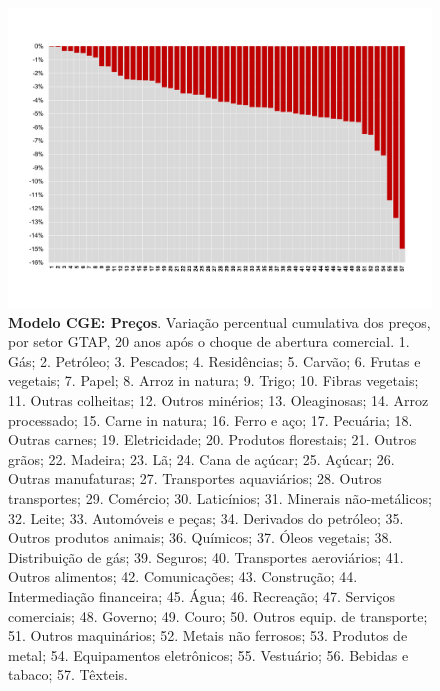 \documentclass{article}
\begin{document}
\newpage
\begin{landscape}
\begin{figure}[htbp]
    \centering
    \includegraphics[scale=0.8]{mod_estatico_precos.pdf}
    \caption[Modelo CGE: Preços]{\textbf{Modelo CGE: Preços}. Variação percentual cumulativa dos preços, por setor GTAP, 20 anos após o choque de abertura comercial. \scriptsize{1. Gás; 2. Petróleo; 3. Pescados; 4. Residências; 5. Carvão; 6. Frutas e vegetais; 7. Papel; 8. Arroz in natura; 9. Trigo; 10. Fibras vegetais; 11. Outras colheitas; 12. Outros minérios; 13. Oleaginosas; 14. Arroz processado; 15. Carne in natura; 16. Ferro e aço; 17. Pecuária; 18. Outras carnes; 19. Eletricidade; 20. Produtos florestais; 21. Outros grãos; 22. Madeira; 23. Lã; 24. Cana de açúcar; 25. Açúcar; 26. Outras manufaturas; 27. Transportes aquaviários; 28. Outros transportes; 29. Comércio; 30. Laticínios; 31. Minerais não-metálicos; 32. Leite; 33. Automóveis e peças; 34. Derivados do petróleo; 35. Outros produtos animais; 36. Químicos; 37. Óleos vegetais; 38. Distribuição de gás; 39. Seguros; 40. Transportes aeroviários; 41. Outros alimentos; 42. Comunicações; 43. Construção; 44. Intermediação financeira; 45. Água; 46. Recreação; 47. Serviços comerciais; 48. Governo; 49. Couro; 50. Outros equip. de transporte; 51. Outros maquinários; 52. Metais não ferrosos; 53. Produtos de metal; 54. Equipamentos eletrônicos; 55. Vestuário; 56. Bebidas e tabaco; 57. Têxteis.}}
    \label{fig:mod_estatico_precos}
\end{figure}
\end{landscape}
\newpage
\end{document}
